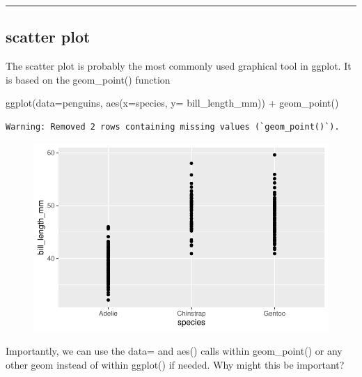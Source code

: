 \documentclass[
  letterpaper,
  DIV=11,
  numbers=noendperiod]{scrartcl}
\newenvironment{Shaded}{\begin{snugshade}}{\end{snugshade}}
\newcommand{\AttributeTok}[1]{\textcolor[rgb]{0.40,0.45,0.13}{#1}}
\newcommand{\FunctionTok}[1]{\textcolor[rgb]{0.28,0.35,0.67}{#1}}
\newcommand{\NormalTok}[1]{\textcolor[rgb]{0.00,0.23,0.31}{#1}}
\newcommand{\SpecialCharTok}[1]{\textcolor[rgb]{0.37,0.37,0.37}{#1}}
\begin{document}
\begin{center}\rule{0.5\linewidth}{0.5pt}\end{center}

\subsection{\texorpdfstring{\textbf{scatter plot}}{scatter plot}}

The scatter plot is probably the most commonly used graphical tool in
ggplot. It is based on the geom\_point() function

\begin{Shaded}
\begin{Highlighting}[]
\FunctionTok{ggplot}\NormalTok{(}\AttributeTok{data=}\NormalTok{penguins, }\FunctionTok{aes}\NormalTok{(}\AttributeTok{x=}\NormalTok{species, }\AttributeTok{y=}\NormalTok{ bill\_length\_mm)) }\SpecialCharTok{+}
  \FunctionTok{geom\_point}\NormalTok{()}
\end{Highlighting}
\end{Shaded}

\begin{verbatim}
Warning: Removed 2 rows containing missing values (`geom_point()`).
\end{verbatim}

\begin{figure}[H]

{\centering \includegraphics{basic_graphs_files/figure-pdf/unnamed-chunk-15-1.pdf}

}

\end{figure}

Importantly, we can use the data= and aes() calls within geom\_point()
or any other geom instead of within ggplot() if needed. Why might this
be important?
\end{document}
